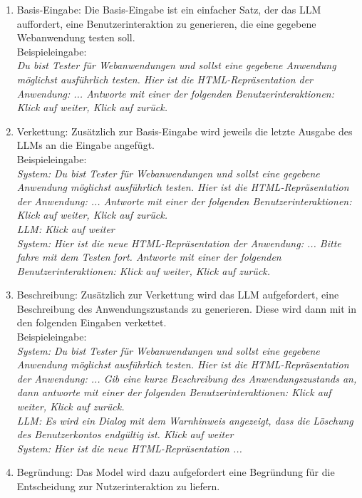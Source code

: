\begin{enumerate}
    \item Basis-Eingabe: Die Basis-Eingabe ist ein einfacher Satz, der das LLM auffordert, eine Benutzerinteraktion zu generieren, die eine gegebene Webanwendung testen soll.
    \\
    Beispieleingabe:
    \\
    \textit{Du bist Tester für Webanwendungen und sollst eine gegebene Anwendung möglichst ausführlich testen.
    Hier ist die HTML-Repräsentation der Anwendung: ...
    Antworte mit einer der folgenden Benutzerinteraktionen: Klick auf \dq weiter\dq, Klick auf \dq zurück\dq.}
    \item Verkettung: Zusätzlich zur Basis-Eingabe wird jeweils die letzte Ausgabe des LLMs an die Eingabe angefügt.
    \\
    Beispieleingabe:
    \\
    \textit{System: Du bist Tester für Webanwendungen und sollst eine gegebene Anwendung möglichst ausführlich testen.
    Hier ist die HTML-Repräsentation der Anwendung: ...
    Antworte mit einer der folgenden Benutzerinteraktionen: Klick auf \dq weiter\dq, Klick auf \dq zurück\dq.
    \\
    LLM: Klick auf \dq weiter\dq
    \\
    System: Hier ist die neue HTML-Repräsentation der Anwendung: ... Bitte fahre mit dem Testen fort. Antworte mit einer der folgenden Benutzerinteraktionen: Klick auf \dq weiter\dq, Klick auf \dq zurück\dq.
    }
    \item Beschreibung: Zusätzlich zur Verkettung wird das LLM aufgefordert, eine Beschreibung des Anwendungszustands zu generieren. Diese wird dann mit in den folgenden Eingaben verkettet.
    \\
    Beispieleingabe:
    \\
    \textit{System: Du bist Tester für Webanwendungen und sollst eine gegebene Anwendung möglichst ausführlich testen.
    Hier ist die HTML-Repräsentation der Anwendung: ... 
    Gib eine kurze Beschreibung des Anwendungszustands an, dann antworte mit einer der folgenden Benutzerinteraktionen: Klick auf \dq weiter\dq, Klick auf \dq zurück\dq.
    \\
    LLM: Es wird ein Dialog mit dem Warnhinweis angezeigt, dass die Löschung des Benutzerkontos endgültig ist. Klick auf \dq weiter\dq
    \\
    System: Hier ist die neue HTML-Repräsentation ...
    }
    \item Begründung: Das Model wird dazu aufgefordert eine Begründung für die Entscheidung zur Nutzerinteraktion zu liefern.

\end{enumerate}
